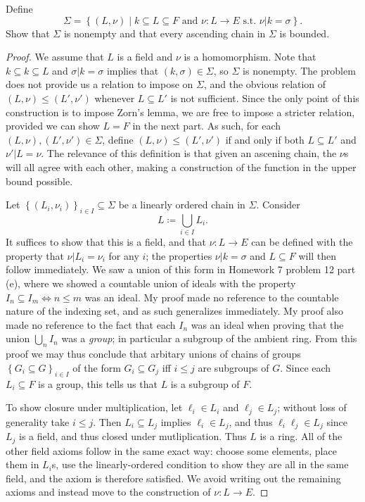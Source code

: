\documentclass[11pt, letterpaper]{article}
\begin{document}
\begin{problem}\label{11.2}
	Define
	\[
		\Sigma =\left\{ (L,\nu )\mid k \subseteq L \subseteq F\text{ and } \nu : L \to E \text{ s.t. } \nu |k=\sigma  \right\} 
	.\]
	Show that $\Sigma $ is nonempty and that every ascending chain in $\Sigma $ is bounded.
\end{problem}
\begin{proof}
	We assume that $L$ is a field and $\nu $ is a homomorphism. Note that $k\subseteq k\subseteq L$ and $\sigma |k = \sigma $ implies that $(k,\sigma )\in \Sigma $, so $\Sigma $ is nonempty. The problem does not provide us a relation to impose on $\Sigma $, and the obvious relation of $(L,\nu )\leq (L',\nu ')$ whenever $L\subseteq L'$ is not sufficient. Since the only point of this construction is to impose Zorn's lemma, we are free to impose a stricter relation, provided we can show $L=F$ in the next part. As such, for each $(L,\nu ),(L',\nu ')\in \Sigma $, define $(L,\nu )\leq (L',\nu ')$ if and only if both $L\subseteq L'$ and $\nu '|L=\nu $. The relevance of this definition is that given an ascening chain, the $\nu $s will all agree with each other, making a construction of the function in the upper bound possible.

	Let $\left\{ (L_i,\nu _i) \right\}_{i\in I} \subseteq \Sigma $ be a linearly ordered chain in $\Sigma $. Consider
	\[
		L\coloneqq \bigcup_{i\in I} L_i 
	.\]
	It suffices to show that this is a field, and that $\nu : L \to E$ can be defined with the property that $\nu |L_i=\nu _i$ for any $i$; the properties $\nu |k=\sigma $ and $L\subseteq F$ will then follow immediately. We saw a union of this form in Homework 7 problem 12 part (e), where we showed a countable union of ideals with the property $I_n \subseteq I_m \iff n \leq m$ was an ideal. My proof made no reference to the countable nature of the indexing set, and as such generalizes immediately. My proof also made no reference to the fact that each $I_n$ was an ideal when proving that the union $\bigcup_{n} I_n$ was a \emph{group}; in particular a subgroup of the ambient ring. From this proof we may thus conclude that arbitary unions of chains of groups $\left\{ G_i\subseteq G \right\}_{i\in I} $ of the form $G_i \subseteq G_j$ iff $i\leq j$ are subgroups of $G$. Since each $L_i \subseteq F$ is a group, this tells us that $L$ is a subgroup of $F$.
	
	To show closure under multiplication, let $\ell _i\in L_i$ and $\ell _j\in L_j$; without loss of generality take $i \leq j$. Then $L_i \subseteq L_j$ implies $\ell _i \in L_j$, and thus $\ell _i \ell _j\in L_j$ since $L_j$ is a field, and thus closed under mutliplication. Thus $L$ is a ring. All of the other field axioms follow in the same exact way: choose some elements, place them in $L_i$s, use the linearly-ordered condition to show they are all in the same field, and the axiom is therefore satisfied. We avoid writing out the remaining axioms and instead move to the construction of $\nu : L \to E$.


\end{proof}
\end{document}
